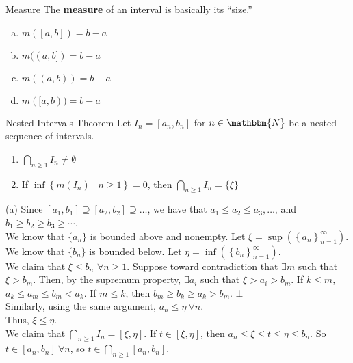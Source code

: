 \documentclass[10pt]{extarticle}
\newcommand{\N}{\mathbbm{N}}
\begin{document}
  \begin{problem}{Measure}
    The \textbf{measure} of an interval is basically its ``size.''
    \begin{enumerate}[(a)]
      \item $m([a,b]) = b-a$
      \item $m((a,b]) = b-a$
      \item $m((a,b)) = b-a$
      \item $m([a,b)) = b-a$
    \end{enumerate}
  \end{problem}
  \begin{problem}{Nested Intervals Theorem}
    Let $I_n = [a_n,b_n]$ for $n\in\N$ be a nested sequence of intervals.
    \begin{enumerate}[(1)]
      \item $\bigcap_{n \geq 1}I_n \neq \emptyset$
      \item If $\inf\left\{m(I_n)\mid n\geq 1\right\} = 0$, then $\bigcap_{n\geq 1} I_n = \{\xi\}$
    \end{enumerate}
    \tcblower
    \begin{problem}{(a)}
      Since $[a_1,b_1] \supseteq [a_2,b_2] \supseteq \dots$, we have that $a_1\leq a_2\leq a_3,\dots$, and $b_1 \geq b_2 \geq b_3 \geq \cdots$.\\

      We know that $\{a_n\}$ is bounded above and nonempty. Let $\xi = \sup\left(\left\{a_n\right\}_{n=1}^{\infty}\right)$.\\

      We know that $\{b_n\}$ is bounded below. Let $\eta = \inf\left(\left\{b_n\right\}_{n=1}^{\infty}\right)$.\\

      We claim that $\xi \leq b_n$ $\forall n \geq 1$. Suppose toward contradiction that $\exists m$ such that $\xi > b_m$. Then, by the supremum property, $\exists a_i$ such that $\xi > a_i > b_m$. If $k\leq m$, $a_k \leq a_m \leq b_m < a_k$. If $m \leq k$, then $b_m \geq b_k \geq a_k > b_m$. $\bot$\\

      Similarly, using the same argument, $a_n \leq \eta~\forall n$.\\

      Thus, $\xi \leq \eta$.\\

      We claim that $\bigcap_{n\geq 1} I_n = [\xi,\eta]$. If $t\in [\xi,\eta]$, then $a_n \leq \xi \leq t \leq \eta \leq b_n$. So $t\in [a_n,b_n]~\forall n$, so $t\in \bigcap_{n\geq 1} [a_n,b_n]$.\\


\end{problem}
\end{problem}
\end{document}
